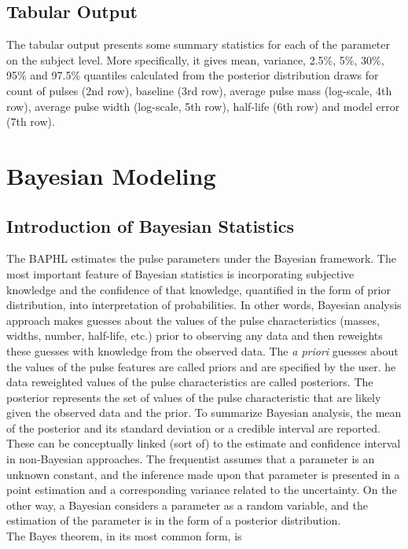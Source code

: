 \documentclass[11pt]{book}
\begin{document}
\section{Tabular Output} \label{o3}
The tabular output presents some summary statistics for each of the parameter on the subject level. More specifically, it gives mean, variance, 2.5\%, 5\%, 30\%, 95\% and 97.5\% quantiles calculated from the posterior distribution draws for count of pulses (2nd row),  baseline (3rd row), average pulse mass (log-scale, 4th row), average pulse width (log-scale, 5th row), half-life (6th row) and model error (7th row).

\chapter{Bayesian Modeling}
\section{Introduction of Bayesian Statistics}
The BAPHL estimates the pulse parameters under the Bayesian framework. The most important feature of Bayesian statistics is incorporating subjective knowledge and the confidence of that knowledge, quantified in the form of prior distribution, into interpretation of probabilities. In other words,
Bayesian analysis approach makes guesses about the values of the pulse characteristics (masses, widths, number, half-life, etc.) prior to observing any data and then reweights these guesses with knowledge from the observed data. The \emph{a priori} guesses about the values of the pulse features are called priors and are specified by the user. he data reweighted values of the pulse characteristics are called posteriors. The posterior represents the set of values of the pulse characteristic that are likely given the observed data and the prior.  To summarize Bayesian analysis, the mean of the posterior and its standard deviation or a credible interval are reported.  These can be conceptually linked (sort of) to the estimate and confidence interval in non-Bayesian approaches.
The frequentist assumes that a parameter is an unknown constant, and the inference made upon that parameter is presented in a point estimation and a corresponding variance related to the uncertainty. On the other way, a Bayesian considers a parameter as a random variable, and the estimation of the parameter is in the form of a posterior distribution.\\
The Bayes theorem, in its most common form, is
\end{document}
